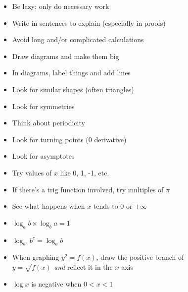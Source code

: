 \documentclass[../main.tex]{subfile}
\begin{document}

\begin{figure}[h]
\centering
\begin{minipage}{0.85\linewidth}

\begin{itemize}
	\item Be lazy; only do necessary work
	\item Write in sentences to explain (especially in proofs)
	\item Avoid long and/or complicated calculations
	\item Draw diagrams and make them big
	\item In diagrams, label things and add lines
	\item Look for similar shapes (often triangles)
\end{itemize}


\begin{itemize}
	\item Look for symmetries
	\item Think about periodicity
	\item Look for turning points (0 derivative)
	\item Look for asymptotes
	\item Try values of $x$ like 0, 1, -1, etc.
	\item If there's a trig function involved, try multiples of $\pi$
	\item See what happens when $x$ tends to 0 or $\pm \infty$
\end{itemize}


\begin{itemize}
	\item $\log_a b \times \log_b a = 1$
	\item $\log_{a^c} b^c = \log_a b$
	\item When graphing $y^2 = f(x)$, draw the positive branch of $y = \sqrt{f(x)}$ \textit{and} reflect it in the $x$ axis
	\item $\log x$ is negative when $0 < x < 1$
\end{itemize}
\end{minipage}
\end{figure}
\end{document}
